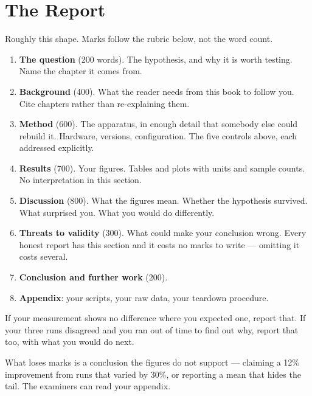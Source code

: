 \section{The Report}

Roughly this shape. Marks follow the rubric below, not the word count.

\begin{enumerate}[leftmargin=2.2em, itemsep=3pt, topsep=4pt]
  \item \textbf{The question} (200 words). The hypothesis, and why it is worth
        testing. Name the chapter it comes from.
  \item \textbf{Background} (400). What the reader needs from this book to
        follow you. Cite chapters rather than re-explaining them.
  \item \textbf{Method} (600). The apparatus, in enough detail that somebody
        else could rebuild it. Hardware, versions, configuration. The five
        controls above, each addressed explicitly.
  \item \textbf{Results} (700). Your figures. Tables and plots with units and
        sample counts. No interpretation in this section.
  \item \textbf{Discussion} (800). What the figures mean. Whether the
        hypothesis survived. What surprised you. What you would do differently.
  \item \textbf{Threats to validity} (300). What could make your conclusion
        wrong. Every honest report has this section and it costs no marks to
        write --- omitting it costs several.
  \item \textbf{Conclusion and further work} (200).
  \item \textbf{Appendix}: your scripts, your raw data, your teardown
        procedure.
\end{enumerate}

\begin{alertbox}
If your measurement shows no difference where you expected one, report that. If
your three runs disagreed and you ran out of time to find out why, report that
too, with what you would do next.

\smallskip
What loses marks is a conclusion the figures do not support --- claiming a 12\%
improvement from runs that varied by 30\%, or reporting a mean that hides the
tail. The examiners can read your appendix.
\end{alertbox}

